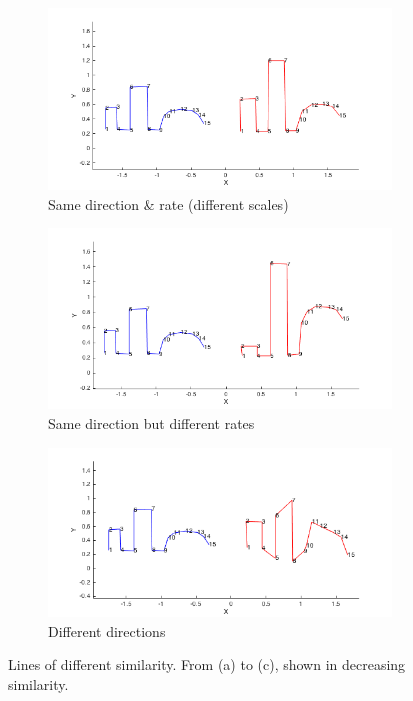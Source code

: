 \documentclass[11]{article}
\begin{document}
\begin{figure}[h]
  \centering
  \begin{subfigure}{.49\textwidth}
    \includegraphics[width=1\linewidth]{figures/similar_lines_A.png}
    \caption{Same direction \& rate (different scales)}
    \label{fig:similar_lines_A}
  \end{subfigure}
  \begin{subfigure}{.49\textwidth}
    \includegraphics[width=1\linewidth]{figures/similar_lines_B.png}
    \caption{Same direction but different rates}
    \label{fig:similar_lines_B}
  \end{subfigure}
  \begin{subfigure}{.49\textwidth}
    \includegraphics[width=1\linewidth]{figures/similar_lines_C.png}
    \caption{Different directions}
    \label{fig:similar_lines_C}
  \end{subfigure}
  \caption{Lines of different similarity. From (a) to (c), shown in decreasing similarity.}
\end{figure}
\end{document}
